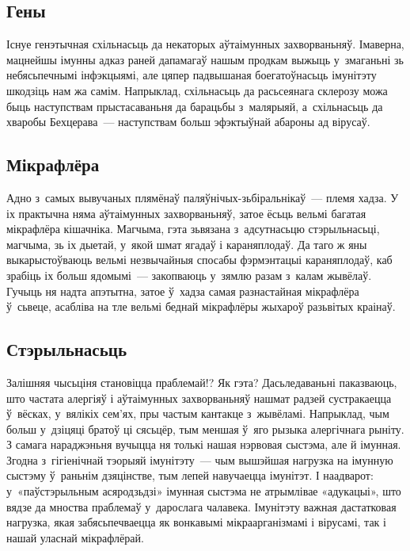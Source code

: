 \subsection*{Гены}

Існуе генэтычная схільнасьць да некаторых аўтаімунных захворваньняў. Імаверна, мацнейшы імунны адказ раней дапамагаў нашым продкам выжыць у~змаганьні зь небясьпечнымі інфэкцыямі, але цяпер падвышаная боегатоўнасьць імунітэту шкодзіць нам жа самім. Напрыклад, схільнасьць да расьсеянага склерозу можа быць наступствам прыстасаваньня да барацьбы з~малярыяй, а~схільнасьць да хваробы Бехцерава~--- наступствам больш эфэктыўнай абароны ад вірусаў.

\subsection*{Мікрафлёра}

Адно з~самых вывучаных плямёнаў паляўнічых-зьбі\-раль\-ні\-каў~--- племя хадза. У іх практычна няма аўтаімунных захворваньняў, затое ёсьць вельмі багатая мікрафлёра кішачніка. Магчыма, гэта зьвязана з~адсутнасьцю стэрыльнасьці, магчыма, зь іх дыетай, у~якой шмат ягадаў і караняплодаў. Да таго ж яны выкарыстоўваюць вельмі незвычайныя спосабы фэрмэнтацыі караняплодаў, каб зрабіць іх больш ядомымі~--- закопваюць у~зямлю разам з~калам жывёлаў. Гучыць ня надта апэтытна, затое ў~хадза самая разнастайная мікрафлёра ў~сьвеце, асабліва на тле вельмі беднай мікрафлёры жыхароў разьвітых краінаў.

\subsection*{Стэрыльнасьць}

Залішняя чысьціня становіцца праблемай!? Як гэта? Дасьледаваньні паказваюць, што частата алергіяў і аўтаімунных захворваньняў нашмат радзей сустракаецца ў~вёсках, у~вялікіх сем'ях, пры частым кантакце з~жывёламі. Напрыклад, чым больш у~дзіцяці братоў ці сясьцёр, тым меншая ў~яго рызыка алергічнага рыніту. З самага нараджэньня вучыцца ня толькі нашая нэрвовая сыстэма, але й імунная. Згодна з~гігіенічнай тэорыяй імунітэту~--- чым вышэйшая нагрузка на імунную сыстэму ў~раньнім дзяцінстве, тым лепей навучаецца імунітэт. І наадварот: у~«паўстэрыльным асяродзьдзі» імунная сыстэма не атрымлівае «адукацыі», што вядзе да мноства праблемаў у~дарослага чалавека. Імунітэту важная дастатковая нагрузка, якая забясьпечваецца як вонкавымі мікраарганізмамі і вірусамі, так і нашай уласнай мікрафлёрай. 

